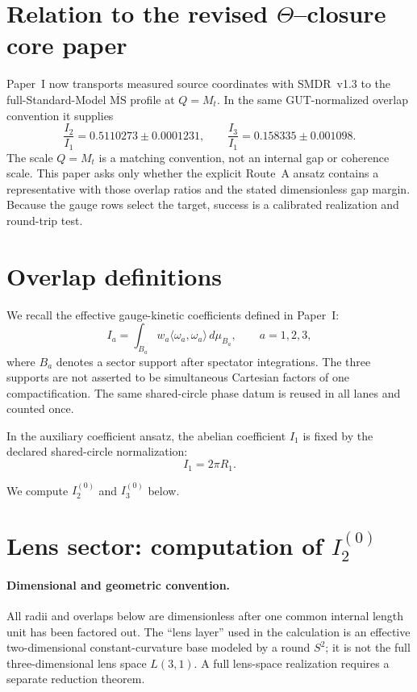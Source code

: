\documentclass[11pt]{article}
\begin{document}
\section{Relation to the revised $\Theta$--closure core paper}

Paper~I now transports measured source coordinates with SMDR~v1.3 to the
full-Standard-Model $\overline{\mathrm{MS}}$ profile at $Q=M_t$.  In the same
GUT-normalized overlap convention it supplies
\[
 \frac{I_2}{I_1}=0.5110273\pm0.0001231,
 \qquad
 \frac{I_3}{I_1}=0.158335\pm0.001098.
\]
The scale $Q=M_t$ is a matching convention, not an internal gap or coherence
scale.  This paper asks only whether the explicit Route~A ansatz contains a
representative with those overlap ratios and the stated dimensionless gap
margin.  Because the gauge rows select the target, success is a calibrated
realization and round-trip test.

\section{Overlap definitions}

We recall the effective gauge-kinetic coefficients defined in Paper~I:
\[
I_a = \int_{B_a}
w_a\langle \omega_a, \omega_a\rangle\,d\mu_{B_a},
\qquad a=1,2,3,
\]
where $B_a$ denotes a sector support after spectator integrations. The three
supports are not asserted to be simultaneous Cartesian factors of one
compactification. The same shared-circle phase datum is reused in all lanes
and counted once.

In the auxiliary coefficient ansatz, the abelian coefficient $I_1$ is fixed by
the declared shared-circle normalization:
\[
I_1 = 2\pi R_1.
\]

We compute $I_2^{(0)}$ and $I_3^{(0)}$ below.


\section{Lens sector: computation of $I_2^{(0)}$}

\paragraph{Dimensional and geometric convention.}
All radii and overlaps below are dimensionless after one common internal length
unit has been factored out.  The ``lens layer'' used in the calculation is an
effective two-dimensional constant-curvature base modeled by a round $S^2$; it
is not the full three-dimensional lens space $L(3,1)$.  A full lens-space
realization requires a separate reduction theorem.
\end{document}
